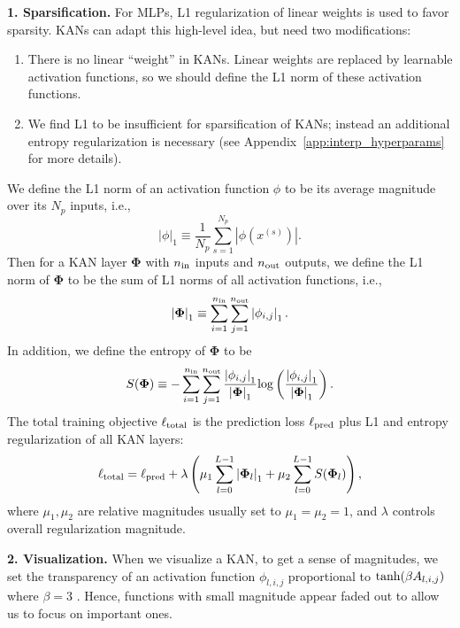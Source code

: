 \documentclass{article}
\numberwithin{equation}{section}
\numberwithin{figure}{section}
\newcommand{\mat}[1]{\mathbf{#1}}
\begin{document}
{\bf 1. Sparsification.} For MLPs, L1 regularization of linear weights is used to favor sparsity. KANs can adapt this high-level idea, but need two modifications: 
\begin{enumerate}[(1)]
    \item There is no linear ``weight'' in KANs. Linear weights are replaced by learnable activation functions,  so we should define the L1 norm of these activation functions.
    \item We find L1 to be insufficient for sparsification of KANs; instead an additional entropy regularization is necessary (see Appendix~\ref{app:interp_hyperparams} for more details).
\end{enumerate}
We define the L1 norm of an activation function $\phi$ to be its average magnitude over its $N_p$ inputs, i.e.,
\begin{equation}
    \left|\phi\right|_1 \equiv \frac{1}{N_p}\sum_{s=1}^{N_p} \left|\phi(x^{(s)})\right|.
\end{equation}
Then for a KAN layer $\mat{\Phi}$ with $n_{\rm in}$ inputs and $n_{\rm out}$ outputs, we define the L1 norm of $\mat{\Phi}$ to be the sum of L1 norms of all activation functions, i.e.,
\begin{equation}
    \left|\mat{\Phi}\right|_1 \equiv \sum_{i=1}^{n_{\rm in}}\sum_{j=1}^{n_{\rm out}} \left|\phi_{i,j}\right|_1.
\end{equation}
In addition, we define the entropy of $\mat{\Phi}$ to be
\begin{equation}
    S(\mat{\Phi}) \equiv -\sum_{i=1}^{n_{\rm in}}\sum_{j=1}^{n_{\rm out}} \frac{\left|\phi_{i,j}\right|_1}{\left|\mat{\Phi}\right|_1}{\rm log}\left(\frac{\left|\phi_{i,j}\right|_1}{\left|\mat{\Phi}\right|_1}\right).
\end{equation}
The total training objective $\ell_{\rm total}$ is the prediction loss $\ell_{\rm pred}$ plus L1 and entropy regularization of all KAN layers:
\begin{equation}
    \ell_{\rm total} = \ell_{\rm pred} + \lambda \left(\mu_1 \sum_{l=0}^{L-1}\left|\mat{\Phi}_l\right|_1 + \mu_2 \sum_{l=0}^{L-1}S(\mat{\Phi}_l)\right),
\end{equation}
where $\mu_1,\mu_2$ are relative magnitudes usually set to $\mu_1=\mu_2=1$, and $\lambda$ controls overall regularization magnitude.

{\bf 2. Visualization.} When we visualize a KAN, to get a sense of magnitudes, we set the transparency of an activation function $\phi_{l,i,j}$ proportional to ${\rm tanh}(\beta A_{l,i,j})$ where $\beta=3$ . Hence, functions with small magnitude appear faded out to allow us to focus on important ones.
\end{document}
